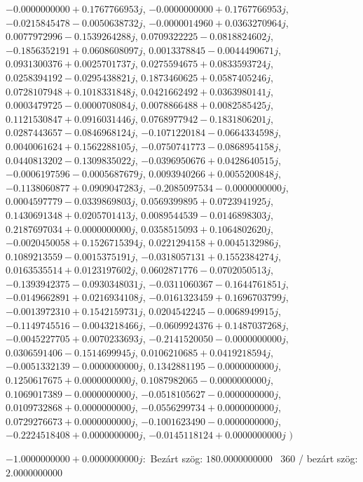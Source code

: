 \documentclass[14pt,a4paper]{article}
\begin{document}
\begin{itemize}
$-0.0000000000+0.1767766953j$, $-0.0000000000+0.1767766953j$, $-0.0215845478-0.0050638732j$, $-0.0000014960+0.0363270964j$, $0.0077972996-0.1539264288j$, $0.0709322225-0.0818824602j$, $-0.1856352191+0.0608608097j$, $0.0013378845-0.0044490671j$, $0.0931300376+0.0025701737j$, $0.0275594675+0.0833593724j$, $0.0258394192-0.0295438821j$, $0.1873460625+0.0587405246j$, $0.0728107948+0.1018331848j$, $0.0421662492+0.0363980141j$, $0.0003479725-0.0000708084j$, $0.0078866488+0.0082585425j$, $0.1121530847+0.0916031446j$, $0.0768977942-0.1831806201j$, $0.0287443657-0.0846968124j$, $-0.1071220184-0.0664334598j$, $0.0040061624+0.1562288105j$, $-0.0750741773-0.0868954158j$, $0.0440813202-0.1309835022j$, $-0.0396950676+0.0428640515j$, $-0.0006197596-0.0005687679j$, $0.0093940266+0.0055200848j$, $-0.1138060877+0.0909047283j$, $-0.2085097534-0.0000000000j$, $0.0004597779-0.0339869803j$, $0.0569399895+0.0723941925j$, $0.1430691348+0.0205701413j$, $0.0089544539-0.0146898303j$, $0.2187697034+0.0000000000j$, $0.0358515093+0.1064802620j$, $-0.0020450058+0.1526715394j$, $0.0221294158+0.0045132986j$, $0.1089213559-0.0015375191j$, $-0.0318057131+0.1552384274j$, $0.0163535514+0.0123197602j$, $0.0602871776-0.0702050513j$, $-0.1393942375-0.0930348031j$, $-0.0311060367-0.1644761851j$, $-0.0149662891+0.0216934108j$, $-0.0161323459+0.1696703799j$, $-0.0013972310+0.1542159731j$, $0.0204542245-0.0068949915j$, $-0.1149745516-0.0043218466j$, $-0.0609924376+0.1487037268j$, $-0.0045227705+0.0070233693j$, $-0.2141520050-0.0000000000j$, $0.0306591406-0.1514699945j$, $0.0106210685+0.0419218594j$, $-0.0051332139-0.0000000000j$, $0.1342881195-0.0000000000j$, $0.1250617675+0.0000000000j$, $0.1087982065-0.0000000000j$, $0.1069017389-0.0000000000j$, $-0.0518105627-0.0000000000j$, $0.0109732868+0.0000000000j$, $-0.0556299734+0.0000000000j$, $0.0729276673+0.0000000000j$, $-0.1001623490-0.0000000000j$, $-0.2224518408+0.0000000000j$, $-0.0145118124+0.0000000000j$
$\big)$
\end{itemize}
$-1.0000000000+0.0000000000j$:\
Bezárt szög: $180.0000000000$ \
360 / bezárt szög: $2.0000000000$\
\end{document}
